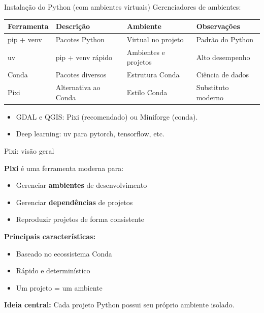 \documentclass{beamer}
\begin{document}
\begin{frame}{Instalação do Python (com ambientes virtuais)}
    Gerenciadores de ambientes:
    \begin{tabular}{p{2cm} p{2.5cm} p{2.8cm} p{3cm}}
        \toprule
        \textbf{Ferramenta} &
        \textbf{Descrição} &
        \textbf{Ambiente} &
        \textbf{Observações} \\
        \midrule
        
        pip + venv &
        Pacotes Python &
        Virtual no projeto &
        Padrão do Python \\ \midrule
        
        uv &
        pip + venv rápido &
        Ambientes e projetos &
        Alto desempenho \\ \midrule
        
        Conda &
        Pacotes diversos &
        Estrutura Conda &
        Ciência de dados \\ \midrule
        
        Pixi &
        Alternativa ao Conda &
        Estilo Conda &
        Substituto moderno \\
        
        \bottomrule
    \end{tabular}
    \begin{itemize}
        \item GDAL e QGIS: Pixi (recomendado) ou Miniforge (conda).
        \item Deep learning: uv para pytorch, tensorflow, etc.
    \end{itemize}
\end{frame}



\begin{frame}{Pixi: visão geral}
    
    \textbf{Pixi} é uma ferramenta moderna para:
    \begin{itemize}
        \item Gerenciar \textbf{ambientes} de desenvolvimento
        \item Gerenciar \textbf{dependências} de projetos
        \item Reproduzir projetos de forma consistente
    \end{itemize}
    
    \vspace{0.3cm}
    
    \textbf{Principais características:}
    \begin{itemize}
        \item Baseado no ecossistema Conda
        \item Rápido e determinístico
        \item Um projeto = um ambiente
    \end{itemize}
    
    \vspace{0.3cm}
    
    \textbf{Ideia central:}  
    Cada projeto Python possui seu próprio ambiente isolado.
    
\end{frame}
\end{document}
